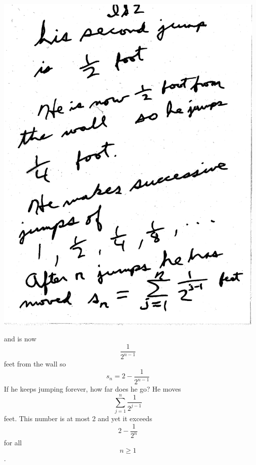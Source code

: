 \documentclass[10pt,a4paper]{article}
\begin{document}
{{\includegraphics[scale=.5]{Pages/IS_2}

\newpage

and is now $${\frac{1}{2^{n-1}}}$$ feet from the wall so $${s_{n}=2-{\frac{1}{2^{n-1}}}}$$ If he keeps jumping forever, how far does he go? He moves $$\sum_{j=1}^{n} {\frac{1}{2^{j-1}}}$$ feet. This number is at most 2 and yet it exceeds $$2-{\frac{1}{2^{n}}}$$ for all $$n\geq1$$. 

}}
\end{document}
